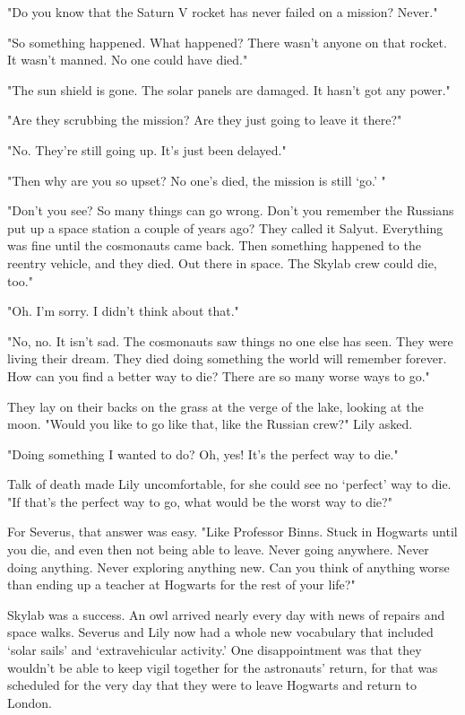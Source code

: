 "Do you know that the Saturn V rocket has never failed on a mission? Never."

"So something happened. What happened? There wasn't anyone on that rocket. It wasn't manned. No one could have died."

"The sun shield is gone. The solar panels are damaged. It hasn't got any power."

"Are they scrubbing the mission? Are they just going to leave it there?"

"No. They're still going up. It's just been delayed."

"Then why are you so upset? No one's died, the mission is still `go.' "

"Don't you see? So many things can go wrong. Don't you remember the Russians put up a space station a couple of years ago? They called it Salyut. Everything was fine until the cosmonauts came back. Then something happened to the reentry vehicle, and they{\el} died. Out there in space. The Skylab crew could die, too."

"Oh. I'm sorry. I didn't think about that."

"No, no. It isn't sad. The cosmonauts saw things no one else has seen. They were living their dream. They died doing something the world will remember forever. How can you find a better way to die? There are so many worse ways to go."

They lay on their backs on the grass at the verge of the lake, looking at the moon. "Would you like to go like that, like the Russian crew?" Lily asked.

"Doing something I wanted to do? Oh, yes! It's the perfect way to die."

Talk of death made Lily uncomfortable, for she could see no `perfect' way to die. "If that's the perfect way to go, what would be the worst way to die?"

For Severus, that answer was easy. "Like Professor Binns. Stuck in Hogwarts until you die, and even then not being able to leave. Never going anywhere. Never doing anything. Never exploring anything new. Can you think of anything worse than ending up a teacher at Hogwarts for the rest of your life?"

Skylab was a success. An owl arrived nearly every day with news of repairs and space walks. Severus and Lily now had a whole new vocabulary that included `solar sails' and `extravehicular activity.' One disappointment was that they wouldn't be able to keep vigil together for the astronauts' return, for that was scheduled for the very day that they were to leave Hogwarts and return to London.

